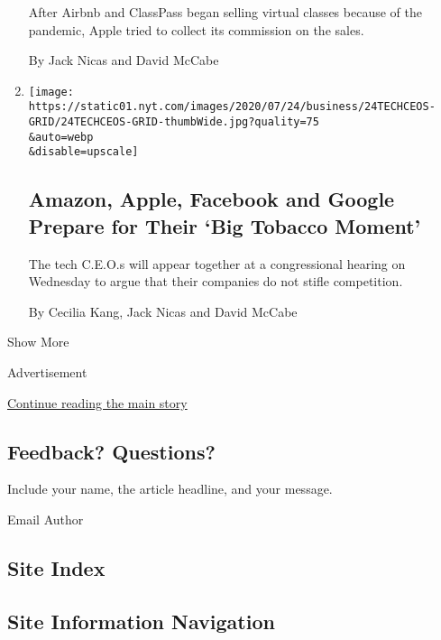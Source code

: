\begin{enumerate}
  After Airbnb and ClassPass began selling virtual classes because of
  the pandemic, Apple tried to collect its commission on the sales.

  By Jack Nicas and David McCabe
\item
  \href{/2020/07/28/technology/amazon-apple-facebook-google-antitrust-hearing.html}{}

  \texttt{[image: https://static01.nyt.com/images/2020/07/24/business/24TECHCEOS-GRID/24TECHCEOS-GRID-thumbWide.jpg?quality=75\\\&auto=webp\\\&disable=upscale]}

  \hypertarget{amazon-apple-facebook-and-google-prepare-for-their-big-tobacco-moment}{%
  \subsection{Amazon, Apple, Facebook and Google Prepare for Their `Big
  Tobacco
  Moment'}\label{amazon-apple-facebook-and-google-prepare-for-their-big-tobacco-moment}}

  The tech C.E.O.s will appear together at a congressional hearing on
  Wednesday to argue that their companies do not stifle competition.

  By Cecilia Kang, Jack Nicas and David McCabe
\end{enumerate}

Show More

Advertisement

\protect\hyperlink{after-mid2}{Continue reading the main story}

\hypertarget{feedback-questions}{%
\subsection{Feedback? Questions?}\label{feedback-questions}}

Include your name, the article headline, and your message.

Email Author

\hypertarget{site-index}{%
\subsection{Site Index}\label{site-index}}

\hypertarget{site-information-navigation}{%
\subsection{Site Information
Navigation}\label{site-information-navigation}}

